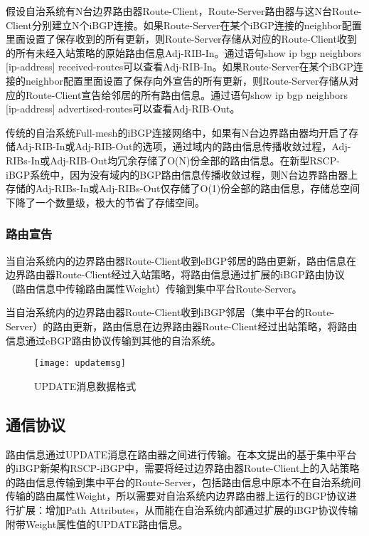 假设自治系统有N台边界路由器Route-Client，Route-Server路由器与这N台Route-Client分别建立N个iBGP连接。如果Route-Server在某个iBGP连接的neighbor配置里面设置了保存收到的所有更新，则Route-Server存储从对应的Route-Client收到的所有未经入站策略的原始路由信息Adj-RIB-In。通过语句show ip bgp neighbors [ip-address] received-routes可以查看Adj-RIB-In。如果Route-Server在某个iBGP连接的neighbor配置里面设置了保存向外宣告的所有更新，则Route-Server存储从对应的Route-Client宣告给邻居的所有路由信息。通过语句show ip bgp neighbors [ip-address] advertised-routes可以查看Adj-RIB-Out。

传统的自治系统Full-mesh的iBGP连接网络中，如果有N台边界路由器均开启了存储Adj-RIB-In或Adj-RIB-Out的选项，通过域内的路由信息传播收敛过程，Adj-RIBs-In或Adj-RIB-Out均冗余存储了O(N)份全部的路由信息。在新型RSCP-iBGP系统中，因为没有域内的BGP路由信息传播收敛过程，则N台边界路由器上存储的Adj-RIBs-In或Adj-RIBs-Out仅存储了O(1)份全部的路由信息，存储总空间下降了一个数量级，极大的节省了存储空间。


\subsubsection{路由宣告}

当自治系统内的边界路由器Route-Client收到eBGP邻居的路由更新，路由信息在边界路由器Route-Client经过入站策略，将路由信息通过扩展的iBGP路由协议（路由信息中传输路由属性Weight）传输到集中平台Route-Server。

当自治系统内的边界路由器Route-Client收到iBGP邻居（集中平台的Route-Server）的路由更新，路由信息在边界路由器Route-Client经过出站策略，将路由信息通过eBGP路由协议传输到其他的自治系统。

\begin{figure}
  \centering
  \texttt{[image: updatemsg]}
  \caption{UPDATE消息数据格式}
  \label{fig:updatemsg}
\end{figure}



\subsection{通信协议}
路由信息通过UPDATE消息在路由器之间进行传输。在本文提出的基于集中平台的iBGP新架构RSCP-iBGP中，需要将经过边界路由器Route-Client上的入站策略的路由信息传输到集中平台的Route-Server，包括路由信息中原本不在自治系统间传输的路由属性Weight，所以需要对自治系统内边界路由器上运行的BGP协议进行扩展：增加Path Attributes，从而能在自治系统内部通过扩展的iBGP协议传输附带Weight属性值的UPDATE路由信息。

